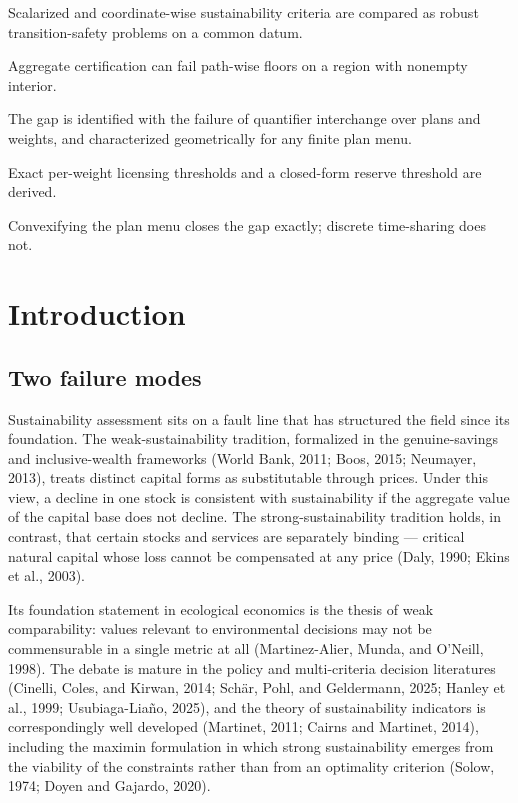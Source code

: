 \documentclass[review,11pt]{elsarticle}
\begin{document}
\begin{frontmatter}
\begin{highlights}
\item Scalarized and coordinate-wise sustainability criteria are compared as robust transition-safety problems on a common datum.
\item Aggregate certification can fail path-wise floors on a region with nonempty interior.
\item The gap is identified with the failure of quantifier interchange over plans and weights, and characterized geometrically for any finite plan menu.
\item Exact per-weight licensing thresholds and a closed-form reserve threshold are derived.
\item Convexifying the plan menu closes the gap exactly; discrete time-sharing does not.
\end{highlights}

\end{frontmatter}

\section{Introduction}\label{introduction}

\subsection{Two failure modes}\label{two-failure-modes}

Sustainability assessment sits on a fault line that has structured the
field since its foundation. The weak-sustainability tradition,
formalized in the genuine-savings and inclusive-wealth frameworks (World
Bank, 2011; Boos, 2015; Neumayer, 2013), treats distinct capital forms
as substitutable through prices. Under this view, a decline in one stock
is consistent with sustainability if the aggregate value of the capital
base does not decline. The strong-sustainability tradition holds, in
contrast, that certain stocks and services are separately binding ---
critical natural capital whose loss cannot be compensated at any price
(Daly, 1990; Ekins et al., 2003).

Its foundation statement in ecological
economics is the thesis of weak comparability: values relevant to
environmental decisions may not be commensurable in a single metric at
all (Martinez-Alier, Munda, and O'Neill, 1998). The debate is mature in
the policy and multi-criteria decision literatures (Cinelli, Coles, and
Kirwan, 2014; Sch\"ar, Pohl, and Geldermann, 2025; Hanley et al., 1999;
Usubiaga-Lia\~no, 2025), and the theory of sustainability indicators is
correspondingly well developed (Martinet, 2011; Cairns and Martinet,
2014), including the maximin formulation in which strong sustainability
emerges from the viability of the constraints rather than from an
optimality criterion (Solow, 1974; Doyen and Gajardo, 2020).
\end{document}
